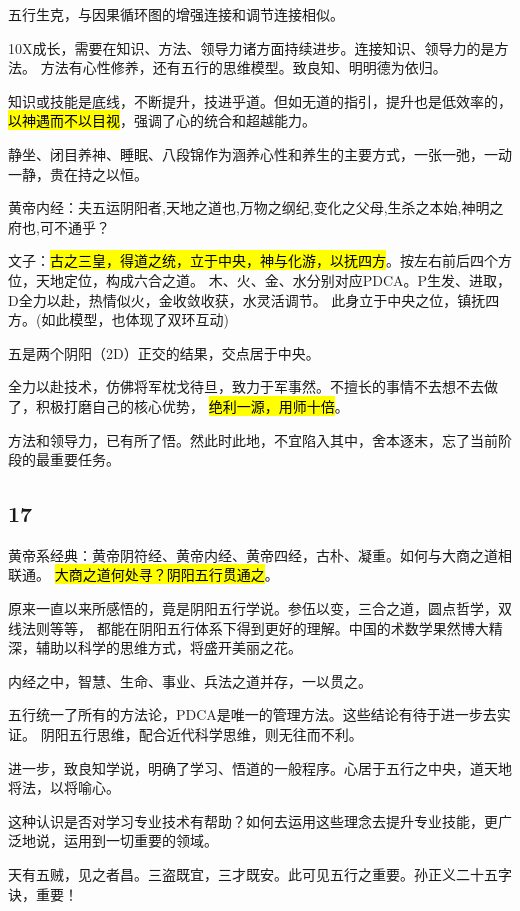 五行生克，与因果循环图的增强连接和调节连接相似。

10X成长，需要在知识、方法、领导力诸方面持续进步。连接知识、领导力的是方法。
方法有心性修养，还有五行的思维模型。致良知、明明德为依归。

知识或技能是底线，不断提升，技进乎道。但如无道的指引，提升也是低效率的，
\hl{以神遇而不以目视}，强调了心的统合和超越能力。

静坐、闭目养神、睡眠、八段锦作为涵养心性和养生的主要方式，一张一弛，一动一静，贵在持之以恒。

黄帝内经：夫五运阴阳者,天地之道也,万物之纲纪,变化之父母,生杀之本始,神明之府也,可不通乎？

文子：\hl{古之三皇，得道之统，立于中央，神与化游，以抚四方}。按左右前后四个方位，天地定位，构成六合之道。
木、火、金、水分别对应PDCA。P生发、进取，D全力以赴，热情似火，金收敛收获，水灵活调节。
此身立于中央之位，镇抚四方。(如此模型，也体现了双环互动)

五是两个阴阳（2D）正交的结果，交点居于中央。

全力以赴技术，仿佛将军枕戈待旦，致力于军事然。不擅长的事情不去想不去做了，积极打磨自己的核心优势，
\hl{绝利一源，用师十倍}。

方法和领导力，已有所了悟。然此时此地，不宜陷入其中，舍本逐末，忘了当前阶段的最重要任务。

\subsection{17}

黄帝系经典：黄帝阴符经、黄帝内经、黄帝四经，古朴、凝重。如何与大商之道相联通。
\hl{大商之道何处寻？阴阳五行贯通之}。

原来一直以来所感悟的，竟是阴阳五行学说。参伍以变，三合之道，圆点哲学，双线法则等等，
都能在阴阳五行体系下得到更好的理解。中国的术数学果然博大精深，辅助以科学的思维方式，将盛开美丽之花。

内经之中，智慧、生命、事业、兵法之道并存，一以贯之。

五行统一了所有的方法论，PDCA是唯一的管理方法。这些结论有待于进一步去实证。
阴阳五行思维，配合近代科学思维，则无往而不利。

进一步，致良知学说，明确了学习、悟道的一般程序。心居于五行之中央，道天地将法，以将喻心。

这种认识是否对学习专业技术有帮助？如何去运用这些理念去提升专业技能，更广泛地说，运用到一切重要的领域。

天有五贼，见之者昌。三盗既宜，三才既安。此可见五行之重要。孙正义二十五字诀，重要！

